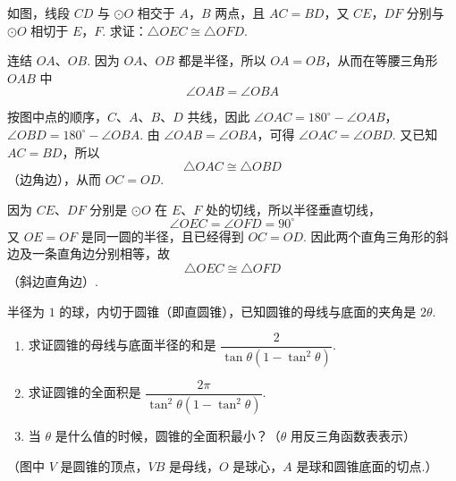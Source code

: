 \documentclass[UTF8,a4paper,oneside,11pt]{ctexbook}
\begin{document}
\begin{problem}
如图，线段 \(CD\) 与 \(\odot O\) 相交于 \(A\)，\(B\) 两点，且 \(AC=BD\)，又 \(CE\)，\(DF\) 分别与 \(\odot O\) 相切于 \(E\)，\(F\). 求证：\(\triangle OEC\cong\triangle OFD\).

\end{problem}

\begin{solution}
连结 \(OA\)、\(OB\). 因为 \(OA\)、\(OB\) 都是半径，所以 \(OA=OB\)，从而在等腰三角形 \(OAB\) 中
\[
\angle OAB=\angle OBA
\]


按图中点的顺序，\(C\)、\(A\)、\(B\)、\(D\) 共线，因此
\(\angle OAC=180^\circ-\angle OAB\)，\(\angle OBD=180^\circ-\angle OBA\).
由 \(\angle OAB=\angle OBA\)，可得 \(\angle OAC=\angle OBD\). 又已知 \(AC=BD\)，所以
\[
\triangle OAC\cong\triangle OBD
\]
（边角边），从而 \(OC=OD\).

因为 \(CE\)、\(DF\) 分别是 \(\odot O\) 在 \(E\)、\(F\) 处的切线，所以半径垂直切线，
\[
\angle OEC=\angle OFD=90^\circ
\]
又 \(OE=OF\) 是同一圆的半径，且已经得到 \(OC=OD\). 因此两个直角三角形的斜边及一条直角边分别相等，故
\[
\triangle OEC\cong\triangle OFD
\]
（斜边直角边）.
\end{solution}

\begin{problem}
半径为 \(1\) 的球，内切于圆锥（即直圆锥），已知圆锥的母线与底面的夹角是 \(2\theta\).

\begin{enumerate}
\item 求证圆锥的母线与底面半径的和是 \(\dfrac{2}{\tan\theta\left(1-\tan^2\theta\right)}\).
\item 求证圆锥的全面积是 \(\dfrac{2\pi}{\tan^2\theta\left(1-\tan^2\theta\right)}\).
\item 当 \(\theta\) 是什么值的时候，圆锥的全面积最小？（\(\theta\) 用反三角函数表表示）
\end{enumerate}

（图中 \(V\) 是圆锥的顶点，\(VB\) 是母线，\(O\) 是球心，\(A\) 是球和圆锥底面的切点.）

\problemresetlayout
{}
\end{problem}
\end{document}
